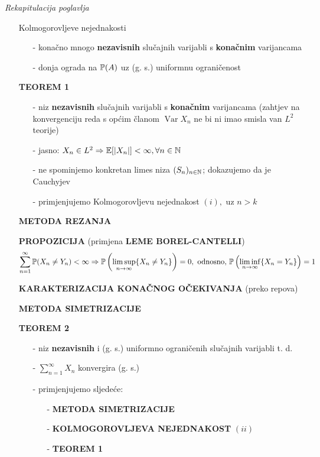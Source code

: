 \documentclass{article}
\newcommand{\Var}{\operatorname{Var}}
\newcommand{\mylimsup}{\underset{n\to\infty}{\lim\sup}}
\newcommand{\myliminf}{\underset{n\to\infty}{\lim\inf}}
\begin{document}
 \emph{Rekapitulacija poglavlja}
 \begin{enumerate}
     \item[\ding{228}] Kolmogorovljeve nejednakosti\begin{enumerate}
         \item[-] konačno mnogo \textbf{nezavisnih} slučajnih varijabli s \textbf{konačnim} varijancama  
         \item[-] donja ograda na \(\Bbb P(A)\) uz (g. s.) uniformnu ograničenost
     \end{enumerate}
     \item[\ding{228}] \textbf{TEOREM 1}\begin{enumerate}
         \item[-] niz \textbf{nezavisnih} slučajnih varijabli s \textbf{konačnim} varijancama (zahtjev na konvergenciju reda s općim članom \(\Var X_n\) ne bi ni imao smisla van  \(L^2\) teorije)
         \item[-] jasno: \(X_n\in L^2\Rightarrow\Bbb E[|X_n|]<\infty,\forall n\in\Bbb N\)
         \item[-] ne spominjemo konkretan limes niza \((S_n)_{n\in\Bbb N}\); dokazujemo da je Cauchyjev
         \item[-] primjenjujemo Kolmogorovljevu nejednakost \((i),\) uz \(n>k\)
     \end{enumerate}
     \item[\ding{228}] \textbf{METODA REZANJA}
     \item[\ding{228}] \textbf{PROPOZICIJA} (primjena \textbf{LEME BOREL-CANTELLI}) \[\sum_{n=1}^\infty\Bbb P(X_n\ne Y_n)<\infty\Rightarrow\Bbb P\left(\mylimsup \{X_n\ne Y_n\}\right)=0,\text{ odnosno, }\Bbb P\left(\myliminf \{X_n= Y_n\}\right)=1\]
     \item[] \textbf{KARAKTERIZACIJA KONAČNOG OČEKIVANJA} (preko repova)
     \item[] \textbf{METODA SIMETRIZACIJE}
     \item[] \textbf{TEOREM 2}\begin{enumerate}
         \item[-] niz \textbf{nezavisnih} i (g. s.) uniformno ograničenih slučajnih varijabli t. d. 
         \item[-] \(\displaystyle\sum_{n=1}^\infty X_n\) konvergira (g. s.)
         \item[-] primjenjujemo sljedeće:\begin{enumerate}
             \item[-] \textbf{METODA SIMETRIZACIJE}
             \item[-] \textbf{KOLMOGOROVLJEVA NEJEDNAKOST} \((ii)\)
             \item[-] \textbf{TEOREM 1}
         \end{enumerate}
     \end{enumerate}
 \end{enumerate}
 \newpage
\end{document}
